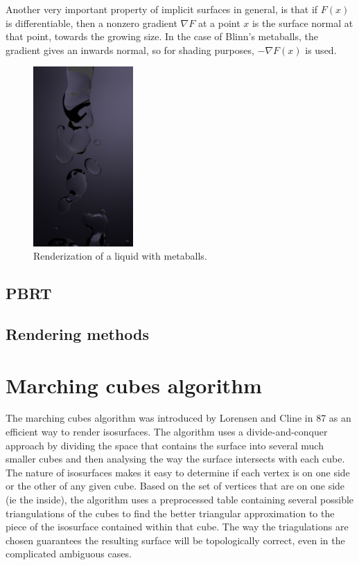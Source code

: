 \documentclass[conference]{acmsiggraph}
\begin{document}
Another very important property of implicit surfaces in general, is that if
$F(x)$ is differentiable, then a nonzero gradient $\nabla F$ at a point $x$ is
the surface normal at that point, towards the growing size. In the case of
Blinn's metaballs, the gradient gives an inwards normal, so for shading
purposes, $-\nabla F(x)$ is used.

\begin{figure}[ht]
  \centering
  \includegraphics[width=1.5in]{images/fluid.png}
  \caption{Renderization of a liquid with metaballs.}
  \label{img:metaball-liquid}
\end{figure}


\subsection{PBRT}

\subsection{Rendering methods}


\section{Marching cubes algorithm}

The marching cubes algorithm was introduced by Lorensen and Cline in 87 as an efficient way to render isosurfaces. The algorithm uses a divide-and-conquer approach by dividing the space that contains the surface into several much smaller cubes and then analysing the way the surface intersects with each cube. The nature of isosurfaces makes it easy to determine if each vertex is on one side or the other of any given cube. Based on the set of vertices that are on one side (ie the inside), the algorithm uses a preprocessed table containing several possible triangulations of the cubes to find the better triangular approximation to the piece of the isosurface contained within that cube. The way the triagulations are chosen guarantees the resulting surface will be topologically correct, even in the complicated ambiguous cases. 
\end{document}
